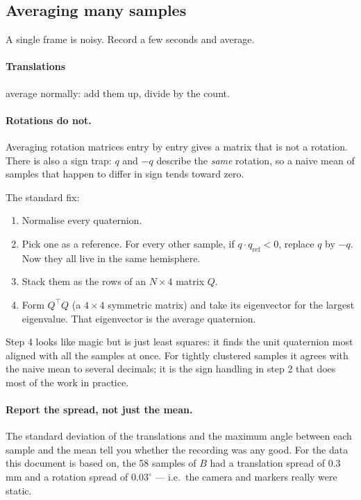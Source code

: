 \documentclass[11pt,a4paper]{article}
\begin{document}
\subsection{Averaging many samples}

A single frame is noisy. Record a few seconds and average.

\paragraph{Translations} average normally: add them up, divide by the count.

\paragraph{Rotations do not.} Averaging rotation matrices entry by entry gives a matrix
that is not a rotation. There is also a sign trap: $q$ and $-q$ describe the
\emph{same} rotation, so a naive mean of samples that happen to differ in sign tends
toward zero.

The standard fix:
\begin{enumerate}[leftmargin=*,itemsep=1pt]
\item Normalise every quaternion.
\item Pick one as a reference. For every other sample, if $q \cdot q_{\text{ref}} < 0$,
      replace $q$ by $-q$. Now they all live in the same hemisphere.
\item Stack them as the rows of an $N \times 4$ matrix $Q$.
\item Form $Q^{\!\top}Q$ (a $4\times4$ symmetric matrix) and take its eigenvector for the
      largest eigenvalue. That eigenvector is the average quaternion.
\end{enumerate}

Step 4 looks like magic but is just least squares: it finds the unit quaternion most
aligned with all the samples at once. For tightly clustered samples it agrees with the
naive mean to several decimals; it is the sign handling in step 2 that does most of the
work in practice.

\paragraph{Report the spread, not just the mean.} The standard deviation of the
translations and the maximum angle between each sample and the mean tell you whether the
recording was any good. For the data this document is based on, the 58 samples of $B$
had a translation spread of $0.3$\,mm and a rotation spread of $0.03^\circ$ --- i.e.\
the camera and markers really were static.
\end{document}

